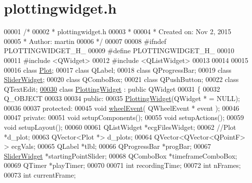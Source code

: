 \hypertarget{plottingwidget_8h_source}{}\section{plottingwidget.\+h}
\label{plottingwidget_8h_source}

\begin{DoxyCode}
00001 \textcolor{comment}{/*}
00002 \textcolor{comment}{ * plottingwidget.h}
00003 \textcolor{comment}{ *}
00004 \textcolor{comment}{ *  Created on: Nov 2, 2015}
00005 \textcolor{comment}{ *      Author: martin}
00006 \textcolor{comment}{ */}
00007 
00008 \textcolor{preprocessor}{#ifndef PLOTTINGWIDGET\_H\_}
00009 \textcolor{preprocessor}{#define PLOTTINGWIDGET\_H\_}
00010 
00011 \textcolor{preprocessor}{#include <QWidget>}
00012 \textcolor{preprocessor}{#include <QListWidget>}
00013 
00014 
00015 
00016 \textcolor{keyword}{class }\hyperlink{classPlot}{Plot};
00017 \textcolor{keyword}{class }QLabel;
00018 \textcolor{keyword}{class }QProgressBar;
00019 \textcolor{keyword}{class }\hyperlink{classSliderWidget}{SliderWidget};
00020 \textcolor{keyword}{class }QComboBox;
00021 \textcolor{keyword}{class }QPushButton;
00022 \textcolor{keyword}{class }QTextEdit;
\hypertarget{plottingwidget_8h_source.tex_l00030}{}\hyperlink{classPlottingWidget}{00030} \textcolor{keyword}{class }\hyperlink{classPlottingWidget}{PlottingWidget} : \textcolor{keyword}{public} QWidget
00031 \{
00032     Q\_OBJECT
00033 
00034 \textcolor{keyword}{public}:
00035     \hyperlink{classPlottingWidget_a094b0449651206a5d5fbad95489d9a05}{PlottingWidget}(QWidget * = NULL);
00036 
00037 \textcolor{keyword}{protected}:
00045     \textcolor{keywordtype}{void} \hyperlink{classPlottingWidget_abcb7d54e226df7067f821c954bb3589b}{wheelEvent}( QWheelEvent * event );
00046 
00047 \textcolor{keyword}{private}:
00051     \textcolor{keywordtype}{void} setupComponents();
00055     \textcolor{keywordtype}{void} setupActions();
00059     \textcolor{keywordtype}{void} setupLayout();
00060 
00061     QListWidget *ecgFilesWidget;
00062     \textcolor{comment}{//Plot *d\_plot;}
00063     QVector<Plot *> d\_plots;
00064     QVector<QVector<QPointF> > ecgVals;
00065     QLabel *tlbl;
00066     QProgressBar *progBar;
00067     \hyperlink{classSliderWidget}{SliderWidget} *startingPointSlider;
00068     QComboBox *timeframeComboBox;
00069     QTimer *playTimer;
00070 
00071     \textcolor{keywordtype}{int} recordingTime;
00072     \textcolor{keywordtype}{int} nFrames;
00073     \textcolor{keywordtype}{int} currentFrame;

\end{DoxyCode}
